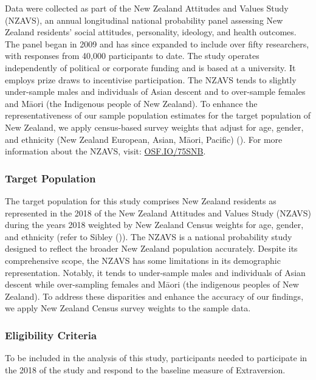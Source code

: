 \documentclass[
  single column]{article}
\begin{document}
Data were collected as part of the New Zealand Attitudes and Values
Study (NZAVS), an annual longitudinal national probability panel
assessing New Zealand residents' social attitudes, personality,
ideology, and health outcomes. The panel began in 2009 and has since
expanded to include over fifty researchers, with responses from 40,000
participants to date. The study operates independently of political or
corporate funding and is based at a university. It employs prize draws
to incentivise participation. The NZAVS tends to slightly under-sample
males and individuals of Asian descent and to over-sample females and
Māori (the Indigenous people of New Zealand). To enhance the
representativeness of our sample population estimates for the target
population of New Zealand, we apply census-based survey weights that
adjust for age, gender, and ethnicity (New Zealand European, Asian,
Māori, Pacific) (). For more
information about the NZAVS, visit:
\href{https://doi.org/10.17605/OSF.IO/75SNB}{OSF.IO/75SNB}.

\subsubsection{Target Population}\label{target-population}

The target population for this study comprises New Zealand residents as
represented in the 2018 of the New Zealand Attitudes and Values Study
(NZAVS) during the years 2018 weighted by New Zealand Census weights for
age, gender, and ethnicity (refer to Sibley
()). The NZAVS is a national probability
study designed to reflect the broader New Zealand population accurately.
Despite its comprehensive scope, the NZAVS has some limitations in its
demographic representation. Notably, it tends to under-sample males and
individuals of Asian descent while over-sampling females and Māori (the
indigenous peoples of New Zealand). To address these disparities and
enhance the accuracy of our findings, we apply New Zealand Census survey
weights to the sample data.

\subsubsection{Eligibility Criteria}\label{eligibility-criteria}

To be included in the analysis of this study, participants needed to
participate in the 2018 of the study and respond to the baseline measure
of Extraversion.
\end{document}
